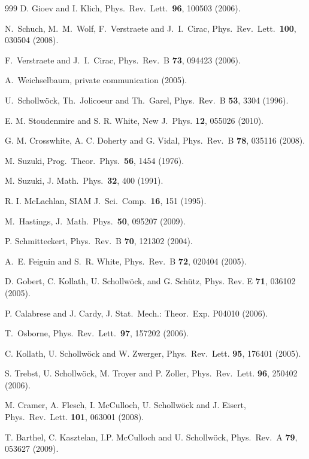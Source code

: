 \documentclass[a4paper,10pt,oneside,onecolumn,1p,times]{elsarticle}
\begin{document}
\begin{thebibliography}{999}
D. Gioev and I. Klich, Phys.\ Rev.\ Lett.\ {\bf 96}, 100503 (2006).

N.~Schuch, M.~M.~Wolf, F.~Verstraete and J.~I.~Cirac,
Phys.\ Rev.\ Lett.\ {\bf 100}, 030504 (2008).

F.~Verstraete and J.~I.~Cirac, Phys.\ Rev.\ B {\bf 73}, 094423 (2006). 

A.~Weichselbaum, private communication (2005).

U.~Schollw\"{o}ck, Th.~Jolicoeur and Th.~Garel, Phys.\ Rev.\ B {\bf 53}, 3304 (1996).

E. M. Stoudenmire and S. R. White, New J.\ Phys. {\bf 12}, 055026 (2010).

G. M. Crosswhite, A. C. Doherty and G. Vidal, Phys.\ Rev.\ B {\bf 78}, 035116 (2008).

 M. Suzuki, Prog.\ Theor.\ Phys.\ {\bf 56}, 1454 (1976).

 M. Suzuki, J. Math.\ Phys.\ {\bf 32}, 400 (1991).

 R. I. McLachlan, SIAM J.\ Sci.\ Comp.\ {\bf 16}, 151 (1995).

 M.~Hastings, J.\ Math.\ Phys.\ {\bf 50}, 095207 (2009).

P. Schmitteckert, Phys.\ Rev.\ B {\bf 70}, 121302 (2004).

A.~E. Feiguin and S.~R. White, Phys.\ Rev.\ B {\bf 72}, 020404 (2005).

D. Gobert, C. Kollath, U. Schollw{\"o}ck, and G. Sch{\"u}tz, Phys. Rev. E {\bf
  71},  036102  (2005).

P. Calabrese and J. Cardy, J. Stat.\ Mech.: Theor.\ Exp. P04010 (2006).

T.~Osborne, Phys.\ Rev.\ Lett.\ {\bf 97}, 157202 (2006).

C. Kollath, U. Schollw\"{o}ck and W. Zwerger, Phys.\ Rev.\ Lett. {\bf 95}, 176401 (2005).

S. Trebst, U. Schollw\"{o}ck, M. Troyer and P. Zoller, Phys.\ Rev.\ Lett. {\bf 96}, 250402 (2006).

M. Cramer, A. Flesch, I. McCulloch, U. Schollw\"{o}ck and J. Eisert, Phys.\ Rev.\ Lett. {\bf 101}, 063001 (2008).

T. Barthel, C. Kasztelan, I.P. McCulloch and U. Schollw\"{o}ck, Phys.\ Rev.\ A {\bf 79}, 053627 (2009).


\end{thebibliography}
\end{document}
